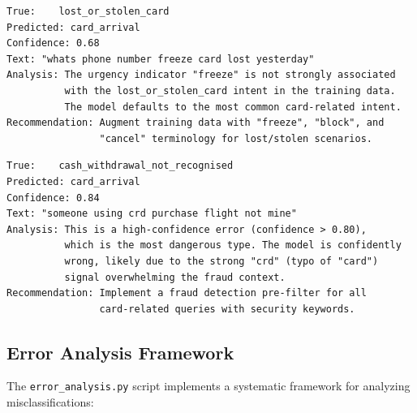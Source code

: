 \documentclass[12pt,a4paper]{article}
\begin{document}
\begin{codebox}
\begin{verbatim}
True:    lost_or_stolen_card
Predicted: card_arrival
Confidence: 0.68
Text: "whats phone number freeze card lost yesterday"
Analysis: The urgency indicator "freeze" is not strongly associated
          with the lost_or_stolen_card intent in the training data.
          The model defaults to the most common card-related intent.
Recommendation: Augment training data with "freeze", "block", and
                "cancel" terminology for lost/stolen scenarios.
\end{verbatim}
\end{codebox}

\begin{codebox}
\begin{verbatim}
True:    cash_withdrawal_not_recognised
Predicted: card_arrival
Confidence: 0.84
Text: "someone using crd purchase flight not mine"
Analysis: This is a high-confidence error (confidence > 0.80),
          which is the most dangerous type. The model is confidently
          wrong, likely due to the strong "crd" (typo of "card")
          signal overwhelming the fraud context.
Recommendation: Implement a fraud detection pre-filter for all
                card-related queries with security keywords.
\end{verbatim}
\end{codebox}

\subsection{Error Analysis Framework}
\label{subsec:error-framework}

The \texttt{error\_analysis.py} script implements a systematic framework for analyzing misclassifications:
\end{document}
